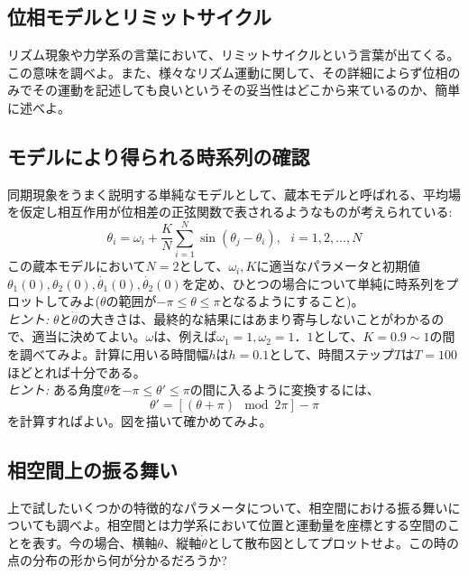 \documentclass{jsarticle}
\begin{document}
\subsection{位相モデルとリミットサイクル}
    リズム現象や力学系の言葉において、リミットサイクルという言葉が出てくる。この意味を調べよ。また、様々なリズム運動に関して、その詳細によらず位相のみでその運動を記述しても良いというその妥当性はどこから来ているのか、簡単に述べよ。

\subsection{モデルにより得られる時系列の確認}
    同期現象をうまく説明する単純なモデルとして、蔵本モデルと呼ばれる、平均場を仮定し相互作用が位相差の正弦関数で表されるようなものが考えられている:
    $$\theta_{i} = \omega_{i} + \frac{K}{N}\sum_{i=1}^{N}\sin(\theta_{j}-\theta_{i}),\ \ \ i=1,2,\dots ,N$$
    この蔵本モデルにおいて$N=2$として、$\omega_{i},K$に適当なパラメータと初期値$\theta_{1}(0), \theta_{2}(0), \dot{\theta_{1}}(0), \dot{\theta_{2}}(0)$を定め、ひとつの場合について単純に時系列をプロットしてみよ($\theta$の範囲が$-\pi \le \theta \le \pi$となるようにすること)。\\
    \emph{ヒント:}  $\theta$と$\dot{\theta}$の大きさは、最終的な結果にはあまり寄与しないことがわかるので、適当に決めてよい。$\omega$は、例えば$\omega_{1} = 1, \omega_{2} = 1．1$として、$K=0.9\sim 1$の間を調べてみよ。計算に用いる時間幅$h$は$h=0.1$として、時間ステップ$T$は$T=100$ほどとれば十分である。\\
    \emph{ヒント:} ある角度$\theta$を$-\pi \le \theta' \le \pi$の間に入るように変換するには、
    $$\theta' = [(\theta + \pi)\mod 2\pi] - \pi$$
    を計算すればよい。図を描いて確かめてみよ。

\subsection{相空間上の振る舞い}
    上で試したいくつかの特徴的なパラメータについて、相空間における振る舞いについても調べよ。相空間とは力学系において位置と運動量を座標とする空間のことを表す。今の場合、横軸$\theta$、縦軸$\dot{\theta}$として散布図としてプロットせよ。この時の点の分布の形から何が分かるだろうか?
\end{document}
